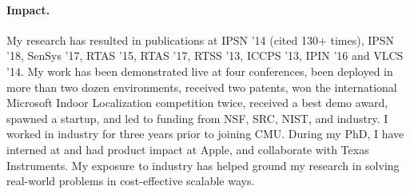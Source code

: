 \documentclass[10pt]{article}
\begin{document}





\paragraph{Impact. }
My research has resulted in publications at IPSN '14 (cited 130+ times), IPSN '18, SenSys '17, RTAS '15, RTAS '17, RTSS '13, ICCPS '13, IPIN '16 and VLCS '14. My work has been demonstrated live at four conferences, been deployed in more than two dozen environments, received two patents, won the international Microsoft Indoor Localization competition twice, received a best demo award, spawned a startup, and led to funding from NSF, SRC, NIST, and industry. I worked in industry for three years prior to joining CMU. During my PhD, I have interned at and had product impact at Apple, and collaborate with Texas Instruments. My exposure to industry has helped ground my research in solving real-world problems in cost-effective scalable ways. %
\end{document}
